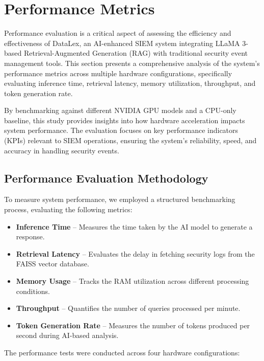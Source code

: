 \section{Performance Metrics}
\label{sec_performance_metrics}

Performance evaluation is a critical aspect of assessing the efficiency and effectiveness of DataLex, an AI-enhanced SIEM system integrating LLaMA 3-based Retrieval-Augmented Generation (RAG) with traditional security event management tools. This section presents a comprehensive analysis of the system's performance metrics across multiple hardware configurations, specifically evaluating inference time, retrieval latency, memory utilization, throughput, and token generation rate.

By benchmarking against different NVIDIA GPU models and a CPU-only baseline, this study provides insights into how hardware acceleration impacts system performance. The evaluation focuses on key performance indicators (KPIs) relevant to SIEM operations, ensuring the system's reliability, speed, and accuracy in handling security events.

\subsection{Performance Evaluation Methodology}
\label{subsec_performance_evaluation_methodology}

To measure system performance, we employed a structured benchmarking process, evaluating the following metrics:

\begin{itemize}
    \item \textbf{Inference Time} -- Measures the time taken by the AI model to generate a response.
    \item \textbf{Retrieval Latency} -- Evaluates the delay in fetching security logs from the FAISS vector database.
    \item \textbf{Memory Usage} -- Tracks the RAM utilization across different processing conditions.
    \item \textbf{Throughput} -- Quantifies the number of queries processed per minute.
    \item \textbf{Token Generation Rate} -- Measures the number of tokens produced per second during AI-based analysis.
\end{itemize}

The performance tests were conducted across four hardware configurations:

